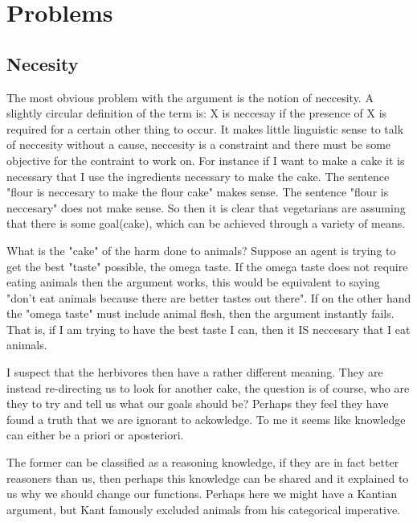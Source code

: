 


\section{Problems}

\subsection{Necesity}

The most obvious problem with the argument is the notion of neccesity. A slightly circular definition of the term is: X is neccesay if the presence of X is required for a certain other thing to occur. It makes little linguistic sense to talk of neccesity without a cause, neccesity is a constraint and there must be some objective for the contraint to work on. For instance if I want to make a cake it is necessary that I use the ingredients necessary to make the cake. The sentence "flour is neccesary to make the flour cake" makes sense. The sentence "flour is neccesary" does not make sense. So then it is clear that vegetarians are assuming that there is some goal(cake), which can be achieved through a variety of means. 

What is the "cake" of the harm done to animals? Suppose an agent is trying to get the best "taste" possible, the omega taste. If the omega taste does not require eating animals then the argument works, this would be equivalent to saying "don't eat animals because there are better tastes out there". If on the other hand the "omega taste" must include animal flesh, then the argument instantly fails. That is, if I am trying to have the best taste I can, then it IS neccesary that I eat animals. 

I suspect that the herbivores then have a rather different meaning. They are instead re-directing us to look for another cake, the question is of course, who are they to try and tell us what our goals should be? Perhaps they feel they have found a truth that we are ignorant to ackowledge. To me it seems like knowledge can either be a priori or aposteriori.

 The former can be classified as a reasoning knowledge, if they are in fact better reasoners than us, then perhaps this knowledge can be shared and it explained to us why we should change our functions. Perhaps here we might have a Kantian argument, but Kant famously excluded animals from his categorical imperative. 

